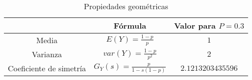 \begin{table}[!ht]
\begin{center}
\begin{tabular}{|c|c|c|}
\hline
  & Fórmula & Valor para $P=0.3$\\ \hline
Media & $E(Y)=\frac{1-p}{p}$ & $1$ \\ \hline
Varianza & $var(Y)=\frac{1-p}{p^2}$ &$2$ \\ \hline
Coeficiente de simetría & $G_Y(s)=\frac{p}{1-s(1-p)}$ & $2.1213203435596$ \\ \hline
\end{tabular}
\end{center}
\caption{Propiedades geométricas}
\label{tabla}
\end{table}
          
         